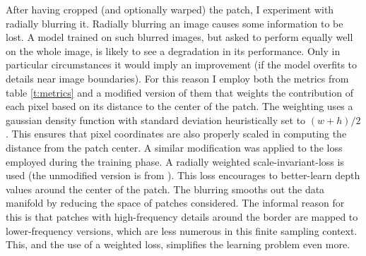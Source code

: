 After having cropped (and optionally warped) the patch, I experiment with radially blurring it.%
Radially blurring an image causes some information to be lost.
A model trained on such blurred images, but asked to perform equally well on the whole image, is likely to see a degradation in its performance.
Only in particular circumstances it would imply an improvement (if the model overfits to details near image boundaries).
For this reason I employ both the metrics from table \ref{t:metrics} and a modified version of them that weights the contribution of each pixel based on its distance to the center of the patch.
The weighting uses a gaussian density function with standard deviation heuristically set to $(w + h) / 2$.
This ensures that pixel coordinates are also properly scaled in computing the distance from the patch center.
A similar modification was applied to the loss employed during the training phase.
A radially weighted scale-invariant-loss is used (the unmodified version is from \cite{Eigen}).
This loss encourages to better-learn depth values around the center of the patch.
The blurring smooths out the data manifold by reducing the space of patches considered.
The informal reason for this is that patches with high-frequency details around the border are mapped to lower-frequency versions, which are less numerous in this finite sampling context.
This, and the use of a weighted loss, simplifies the learning problem even more.

